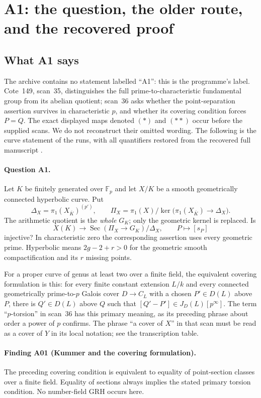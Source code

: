 \section{A1: the question, the older route, and the recovered proof}
\label{sec:a1}

\subsection{What A1 says}
The archive contains no statement labelled ``A1'': this is the programme's
label. Cote~149, scan~35, distinguishes the full prime-to-characteristic
fundamental group from its abelian quotient; scan~36 asks whether the
point-separation assertion survives in characteristic $p$, and whether its
covering condition forces $P=Q$. The exact displayed maps denoted $(*)$ and
$(**)$ occur before the supplied scans. We do not reconstruct their omitted
wording. The following is the curve statement of the runs, with all
quantifiers restored from the recovered full manuscript
\cite[A.1, A.31--A.33]{A1run}.

\paragraph{Question A1.}
Let $K$ be finitely generated over $\mathbb F_p$ and let $X/K$ be a smooth
geometrically connected hyperbolic curve. Put
\[
 \Delta_X=\pi_1(X_{\overline K})^{(p')},\qquad
 \Pi_X=\pi_1(X)/\ker\bigl(\pi_1(X_{\overline K})\to\Delta_X\bigr).
\]
The arithmetic quotient is the \emph{whole} $G_K$; only the geometric
kernel is replaced. Is
\[
 X(K)\longrightarrow
 \operatorname{Sec}(\Pi_X\to G_K)/\Delta_X,
 \qquad P\longmapsto[s_P]
 \tag{A1}
\]
injective? In characteristic zero the corresponding assertion uses every
geometric prime. Hyperbolic means $2g-2+r>0$ for the geometric smooth
compactification and its $r$ missing points.

For a proper curve of genus at least two over a finite field, the equivalent
covering formulation is this: for every finite constant extension $L/k$
and every connected geometrically prime-to-$p$ Galois cover $D\to C_L$
with a chosen $P'\in D(L)$ above $P$, there is $Q'\in D(L)$ above $Q$
such that $[Q'-P']\in J_D(L)[p^\infty]$. The term ``$p$-torsion'' in
scan~36 has this primary meaning, as its preceding phrase about order a
power of $p$ confirms. The phrase ``a cover of $X$'' in that scan must be
read as a cover of $Y$ in its local notation; see the transcription table.

\paragraph{Finding A01 (Kummer and the covering formulation).}
The preceding covering condition is equivalent to equality of point-section
classes over a finite field. Equality of sections always implies the
stated primary torsion condition. No number-field GRH occurs here.

